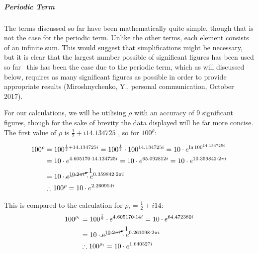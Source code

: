 \subparagraph{Periodic Term} \label{Periodic Term}
The terms discussed so far have been mathematically quite simple, though that is not the case for the periodic term. Unlike the other terms, each element consists of an infinite sum. This would suggest that simplifications might be necessary, but it is clear that the largest number possible of significant figures has been used so far \textendash\ this has been the case due to the periodic term, which as will discussed below, requires as many significant figures as possible in order to provide appropriate results (Miroshnychenko, Y., personal communication, October 2017).

For our calculations, we will be utilising $\rho$ with an accuracy of 9 significant figures, though for the sake of brevity the data displayed will be far more concise. The first value of $\rho$ is $\frac{1}{2} + i14.134725$ \citep{UMNZetaZeros}, so for $100^\rho$:

\begin{equation}
\begin{split}
	100^{\rho} &=100^{\frac{1}{2} + 14.134725i} = 100^{\frac{1}{2}} \cdot 100^{14.134725i} = 10 \cdot e^{\ln 100^{14.134725i}}\\
		&= 10 \cdot e^{4.605170 \cdot 14.134725i} = 10 \cdot e^{65.092812i} = 10 \cdot e^{10.359842\cdot 2\pi i} \\
		&= 10 \cdot \cancelto{1}{e^{10 \cdot 2\pi i}} \cdot e^{0.359842 \cdot 2\pi i} \\
		& \therefore 100^{\rho} = 10 \cdot e^{2.260954i}\\
\end{split}
\end{equation}

This is compared to the calculation for $\rho_t = \frac{1}{2} + i14$:
\begin{equation}
\begin{split}
	100^{\rho_t} &= 100^{\frac{1}{2}} \cdot e^{4.605170 \cdot 14i} = 10 \cdot e^{64.472380i} \\
				&= 10 \cdot \cancelto{1}{e^{10\cdot 2\pi i}} \cdot e^{0.261098 \cdot 2\pi i}\\
				&\therefore 100^{\rho_t} = 10 \cdot e^{1.640527i}
\end{split}
\end{equation}

